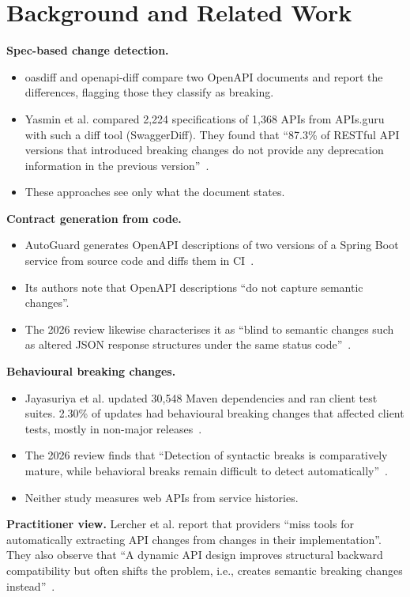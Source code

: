 \documentclass[conference]{IEEEtran}
\begin{document}
\section{Background and Related Work}
\textbf{Spec-based change detection.}
\begin{itemize}
\item oasdiff and openapi-diff compare two OpenAPI documents and report the differences, flagging those they classify as breaking.
\item Yasmin et al. compared 2,224 specifications of 1,368 APIs from APIs.guru with such a diff tool (SwaggerDiff). They found that ``87.3\% of RESTful API versions that introduced breaking changes do not provide any deprecation information in the previous version''~\cite{yasmin2020deprecation}.
\item These approaches see only what the document states.
\end{itemize}

\textbf{Contract generation from code.}
\begin{itemize}
\item AutoGuard generates OpenAPI descriptions of two versions of a Spring Boot service from source code and diffs them in CI~\cite{lercher2025autoguard}.
\item Its authors note that OpenAPI descriptions ``do not capture semantic changes''.
\item The 2026 review likewise characterises it as ``blind to semantic changes such as altered JSON response structures under the same status code''~\cite{chen2026slr}.
\end{itemize}

\textbf{Behavioural breaking changes.}
\begin{itemize}
\item Jayasuriya et al. updated 30,548 Maven dependencies and ran client test suites. 2.30\% of updates had behavioural breaking changes that affected client tests, mostly in non-major releases~\cite{jayasuriya2024behavioral}.
\item The 2026 review finds that ``Detection of syntactic breaks is comparatively mature, while behavioral breaks remain difficult to detect automatically''~\cite{chen2026slr}.
\item Neither study measures web APIs from service histories.
\end{itemize}

\textbf{Practitioner view.} Lercher et al. report that providers ``miss tools for automatically extracting API changes from changes in their implementation''. They also observe that ``A dynamic API design improves structural backward compatibility but often shifts the problem, i.e., creates semantic breaking changes instead''~\cite{lercher2024evolution}.
\end{document}
